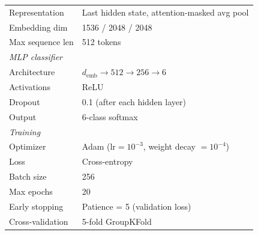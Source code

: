 \begin{table}[t]
\begin{minipage}[t]{0.52\textwidth}
{\begin{tabular}{ll}
    Representation    & Last hidden state, attention-masked avg pool \\
    Embedding dim     & 1536 / 2048 / 2048 \\
    Max sequence len   & 512 tokens \\
    \midrule
    \multicolumn{2}{l}{\textit{MLP classifier}} \\
    Architecture      & $d_{\text{emb}} \to 512 \to 256 \to 6$ \\
    Activations       & ReLU \\
    Dropout           & 0.1 (after each hidden layer) \\
    Output            & 6-class softmax \\
    \midrule
    \multicolumn{2}{l}{\textit{Training}} \\
    Optimizer         & Adam ($\text{lr} = 10^{-3}$, weight decay $= 10^{-4}$) \\
    Loss              & Cross-entropy \\
    Batch size        & 256 \\
    Max epochs        & 20 \\
    Early stopping    & Patience = 5 (validation loss) \\
    Cross-validation  & 5-fold GroupKFold \\
    \bottomrule
  \end{tabular}%
  }
\end{minipage}
\end{table}

\FloatBarrier
\begin{table}[!htbp]
  \centering
  \scriptsize
  \caption{Pairwise AUC with bootstrap 95\% CIs for four of six primary configurations (1{,}000 resamples). All boundary pairs ($\auc > \theta$) $p < 0.01$; OLMo 1v2--4v5 non-significant ($p > 0.09$).}
  \label{tab:s8_cv_folds}
\end{table}

